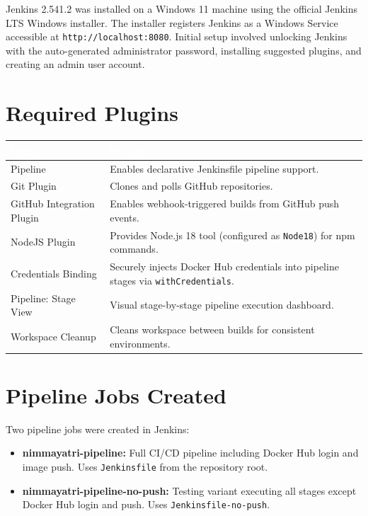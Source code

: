 \documentclass[12pt,a4paper,oneside]{report}
\begin{document}
Jenkins 2.541.2 was installed on a Windows 11 machine using the official Jenkins LTS
Windows installer. The installer registers Jenkins as a Windows Service accessible at
\texttt{http://localhost:8080}. Initial setup involved unlocking Jenkins with the
auto-generated administrator password, installing suggested plugins, and creating an
admin user account.

\section{Required Plugins}

\vspace{6pt}
\begin{center}
\begin{tabular}{|L{0.36\textwidth}|L{0.59\textwidth}|}
\hline
{}
\textcolor{white}{\textbf{Plugin}} &
\textcolor{white}{\textbf{Purpose}} \\
\hline
Pipeline &
  Enables declarative Jenkinsfile pipeline support. \\
Git Plugin &
  Clones and polls GitHub repositories. \\
GitHub Integration Plugin &
  Enables webhook-triggered builds from GitHub push events. \\
NodeJS Plugin &
  Provides Node.js 18 tool (configured as \texttt{Node18}) for npm commands. \\
Credentials Binding &
  Securely injects Docker Hub credentials into pipeline stages via
  \texttt{withCredentials}. \\
Pipeline: Stage View &
  Visual stage-by-stage pipeline execution dashboard. \\
Workspace Cleanup &
  Cleans workspace between builds for consistent environments. \\
\hline
\end{tabular}
\end{center}

\section{Pipeline Jobs Created}

Two pipeline jobs were created in Jenkins:

\begin{itemize}
  \item \textbf{nimmayatri-pipeline:} Full CI/CD pipeline including Docker Hub login
        and image push. Uses \texttt{Jenkinsfile} from the repository root.
  \item \textbf{nimmayatri-pipeline-no-push:} Testing variant executing all stages
        except Docker Hub login and push. Uses \texttt{Jenkinsfile-no-push}.
\end{itemize}
\end{document}
